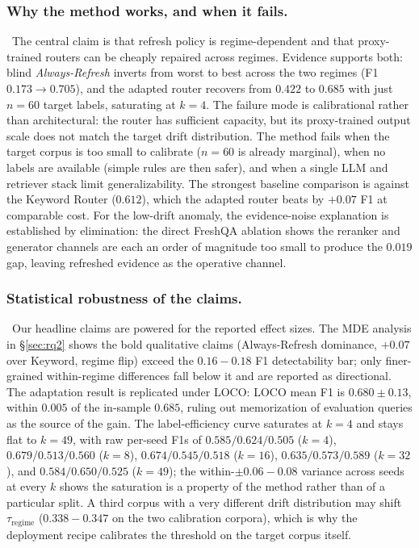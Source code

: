 \documentclass[pdflatex,sn-basic]{sn-jnl}
\begin{document}
\subsubsection*{Why the method works, and when it fails.}~The central claim is that refresh policy is regime-dependent and that proxy-trained routers can be cheaply repaired across regimes. Evidence supports both: blind \emph{Always-Refresh} inverts from worst to best across the two regimes (F1 $0.173 \to 0.705$), and the adapted router recovers from $0.422$ to $0.685$ with just $n{=}60$ target labels, saturating at $k{=}4$. The failure mode is calibrational rather than architectural: the router has sufficient capacity, but its proxy-trained output scale does not match the target drift distribution. The method fails when the target corpus is too small to calibrate ($n{=}60$ is already marginal), when no labels are available (simple rules are then safer), and when a single LLM and retriever stack limit generalizability. The strongest baseline comparison is against the Keyword Router ($0.612$), which the adapted router beats by $+0.07$ F1 at comparable cost. For the low-drift anomaly, the evidence-noise explanation is established by elimination: the direct FreshQA ablation shows the reranker and generator channels are each an order of magnitude too small to produce the $0.019$ gap, leaving refreshed evidence as the operative channel.

\subsubsection*{Statistical robustness of the claims.}~Our headline claims are powered for the reported effect sizes. The MDE analysis in §\ref{sec:rq2} shows the bold qualitative claims (Always-Refresh dominance, $+0.07$ over Keyword, regime flip) exceed the $0.16{-}0.18$ F1 detectability bar; only finer-grained within-regime differences fall below it and are reported as directional. The adaptation result is replicated under LOCO: LOCO mean F1 is $0.680{\pm}0.13$, within $0.005$ of the in-sample $0.685$, ruling out memorization of evaluation queries as the source of the gain. The label-efficiency curve saturates at $k{=}4$ and stays flat to $k{=}49$, with raw per-seed F1s of $0.585/0.624/0.505$ ($k{=}4$), $0.679/0.513/0.560$ ($k{=}8$), $0.674/0.545/0.518$ ($k{=}16$), $0.635/0.573/0.589$ ($k{=}32$), and $0.584/0.650/0.525$ ($k{=}49$); the within-$\pm 0.06{-}0.08$ variance across seeds at every $k$ shows the saturation is a property of the method rather than of a particular split. A third corpus with a very different drift distribution may shift $\tau_{\text{regime}}$ ($0.338{-}0.347$ on the two calibration corpora), which is why the deployment recipe calibrates the threshold on the target corpus itself.
\end{document}
